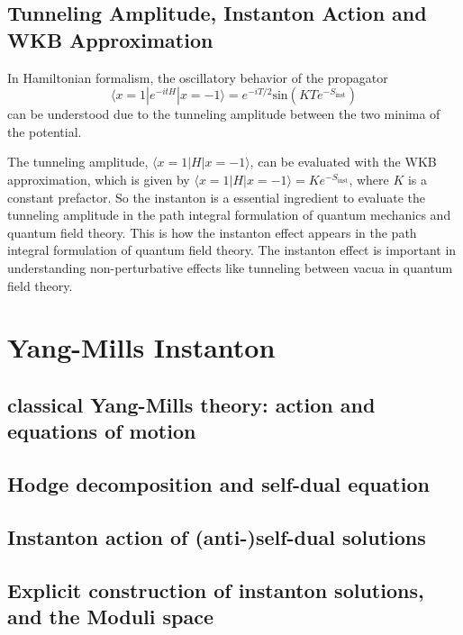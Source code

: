 \documentclass{article}
\begin{document}
\subsection{Tunneling Amplitude, Instanton Action and WKB Approximation}

In Hamiltonian formalism, the oscillatory behavior of the propagator
\begin{equation}
    \langle x = 1 | e^{-itH} | x = -1 \rangle = e^{-iT/2}  \text{sin}(KT e^{-S_{\text{inst}}})
\end{equation} 
can be understood due to the tunneling amplitude between the two minima of the potential.

The tunneling amplitude, $\langle x=1 | H | x=-1 \rangle $, can be evaluated with the WKB approximation, which is given by $\langle x=1 | H | x=-1 \rangle = Ke^{-S_{\text{inst}}}$, where $K$ is a constant prefactor.
So the instanton is a essential ingredient to evaluate the tunneling amplitude in the path integral formulation of quantum mechanics and quantum field theory.
This is how the instanton effect appears in the path integral formulation of quantum field theory. The instanton effect is important in understanding non-perturbative effects like tunneling between vacua in quantum field theory.
\section{Yang-Mills Instanton}

\subsection{classical Yang-Mills theory: action and equations of motion}


\subsection{Hodge decomposition and self-dual equation}


\subsection{Instanton action of (anti-)self-dual solutions}


\subsection{Explicit construction of instanton solutions, and the Moduli space}
\end{document}
